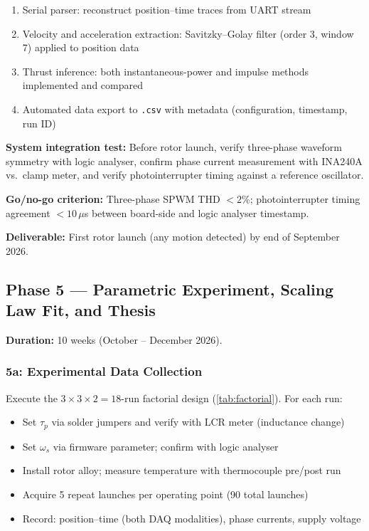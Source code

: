 \documentclass[12pt,letterpaper]{article}
\begin{document}
\begin{enumerate}[noitemsep, label=\arabic*.]
  \item Serial parser: reconstruct position--time traces from UART stream
  \item Velocity and acceleration extraction: Savitzky--Golay filter (order 3,
    window 7) applied to position data
  \item Thrust inference: both instantaneous-power and impulse methods implemented
    and compared
  \item Automated data export to \texttt{.csv} with metadata (configuration,
    timestamp, run ID)
\end{enumerate}

\textbf{System integration test:} Before rotor launch, verify three-phase waveform
symmetry with logic analyser, confirm phase current measurement with INA240A vs.\
clamp meter, and verify photointerrupter timing against a reference oscillator.

\textbf{Go/no-go criterion:} Three-phase SPWM THD $< 2\%$; photointerrupter timing
agreement $< 10\,\mu$s between board-side and logic analyser timestamp.

\textbf{Deliverable:} First rotor launch (any motion detected) by end of September 2026.

\subsection{Phase 5 — Parametric Experiment, Scaling Law Fit, and Thesis}

\textbf{Duration:} 10 weeks (October -- December 2026).

\subsubsection{5a: Experimental Data Collection}

Execute the $3 \times 3 \times 2 = 18$-run factorial design (\cref{tab:factorial}).
For each run:
\begin{itemize}[noitemsep]
  \item Set $\tau_p$ via solder jumpers and verify with LCR meter (inductance change)
  \item Set $\omega_s$ via firmware parameter; confirm with logic analyser
  \item Install rotor alloy; measure temperature with thermocouple pre/post run
  \item Acquire 5 repeat launches per operating point (90 total launches)
  \item Record: position--time (both DAQ modalities), phase currents, supply voltage
\end{itemize}
\end{document}
